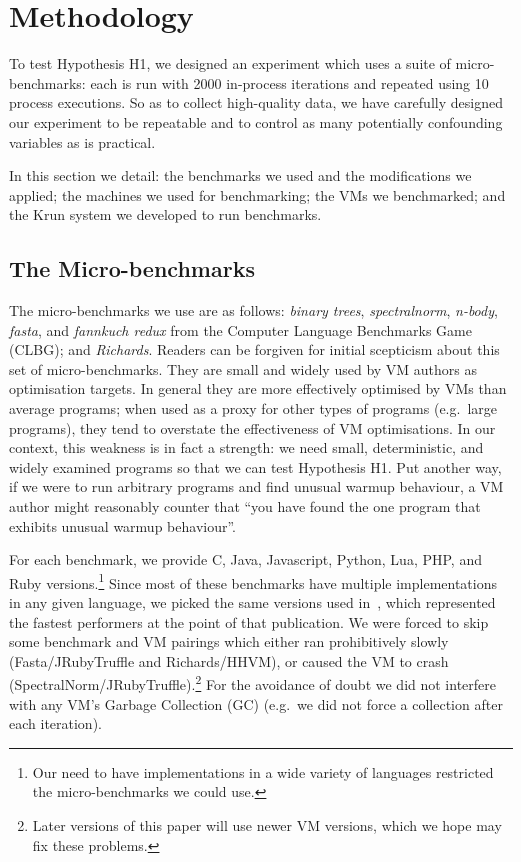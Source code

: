 \documentclass[a4paper,UKenglish]{lipics}
\newcommand{\krun}{Krun\xspace}
\newcommand{\hypone}{H1\xspace}
\newcommand{\binarytrees}{\emph{binary trees}\xspace}
\newcommand{\richards}{\emph{Richards}\xspace}
\newcommand{\spectralnorm}{\emph{spectralnorm}\xspace}
\newcommand{\nbody}{\emph{n-body}\xspace}
\newcommand{\fasta}{\emph{fasta}\xspace}
\newcommand{\fannkuch}{\emph{fannkuch redux}\xspace}
\begin{document}
\section{Methodology}
\label{sec:methodology}

To test Hypothesis H1, we designed an experiment which uses a suite of
micro-benchmarks: each is run with 2000 in-process iterations and repeated
using 10 process executions. So as
to collect high-quality data, we have carefully designed our
experiment to be repeatable and to control as many potentially confounding variables as
is practical.

In this section we detail: the benchmarks we used and the modifications we
applied; the machines we used for benchmarking; the VMs we benchmarked; and the
\krun system we developed to run benchmarks.


\subsection{The Micro-benchmarks}

The micro-benchmarks we use are as follows: \binarytrees, \spectralnorm, \nbody,
\fasta, and \fannkuch from the Computer Language Benchmarks Game (CLBG); and
\richards. Readers can be forgiven for initial scepticism about this set of micro-benchmarks.
They are small and widely
used by VM authors as optimisation targets. In general they are more effectively
optimised by VMs than average programs; when used as a proxy for other types
of programs (e.g.~large programs), they tend to overstate the effectiveness of
VM optimisations. In our context, this weakness is in fact a strength: we need
small, deterministic, and widely examined programs so that we can test
Hypothesis \hypone. Put another way, if we were to run arbitrary programs
and find unusual warmup behaviour, a VM author might reasonably counter that
``you have found the one program that exhibits unusual warmup behaviour''.

For each benchmark, we provide C, Java, Javascript, Python, Lua, PHP,
and Ruby versions.\footnote{Our need to have implementations in a wide variety
of languages restricted the micro-benchmarks we could use.} Since most of these
benchmarks have multiple implementations in any given language, we picked
the same versions used in~\cite{bolz14impact}, which represented the fastest
performers at the point of that publication. We were forced to skip some
benchmark and VM pairings which either ran prohibitively slowly
(Fasta/JRubyTruffle and Richards/HHVM), or caused the VM to crash
(SpectralNorm/JRubyTruffle).\footnote{Later versions of this paper
will use newer VM versions, which we hope may fix these problems.}
For the avoidance of doubt we
did not interfere with any VM's Garbage Collection (GC) (e.g.~we did not
force a collection after each iteration).
\end{document}
